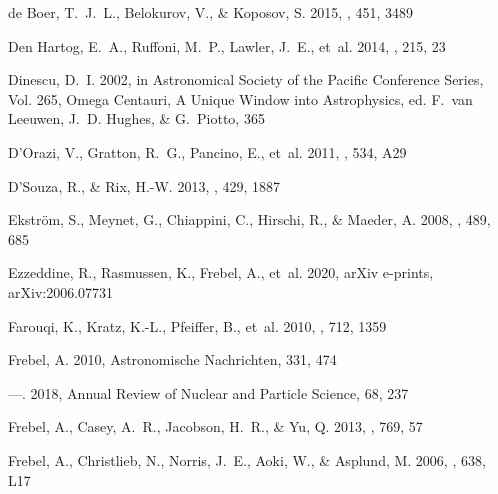 \documentclass[twocolumn]{aastex63}
\begin{document}
\begin{thebibliography}{}
{de Boer}, T.~J.~L., {Belokurov}, V., \& {Koposov}, S. 2015, \mnras, 451, 3489

{Den Hartog}, E.~A., {Ruffoni}, M.~P., {Lawler}, J.~E., {et~al.} 2014, \apjs,
  215, 23

{Dinescu}, D.~I. 2002, in Astronomical Society of the Pacific Conference
  Series, Vol. 265, Omega Centauri, A Unique Window into Astrophysics, ed.
  F.~{van Leeuwen}, J.~D. {Hughes}, \& G.~{Piotto}, 365

{D'Orazi}, V., {Gratton}, R.~G., {Pancino}, E., {et~al.} 2011, \aap, 534, A29

{D'Souza}, R., \& {Rix}, H.-W. 2013, \mnras, 429, 1887

{Ekstr{\"o}m}, S., {Meynet}, G., {Chiappini}, C., {Hirschi}, R., \& {Maeder},
  A. 2008, \aap, 489, 685

{Ezzeddine}, R., {Rasmussen}, K., {Frebel}, A., {et~al.} 2020, arXiv e-prints,
  arXiv:2006.07731

{Farouqi}, K., {Kratz}, K.-L., {Pfeiffer}, B., {et~al.} 2010, \apj, 712, 1359

{Frebel}, A. 2010, Astronomische Nachrichten, 331, 474

---. 2018, Annual Review of Nuclear and Particle Science, 68, 237

{Frebel}, A., {Casey}, A.~R., {Jacobson}, H.~R., \& {Yu}, Q. 2013, \apj, 769,
  57

{Frebel}, A., {Christlieb}, N., {Norris}, J.~E., {Aoki}, W., \& {Asplund}, M.
  2006{}, \apjl, 638, L17


\end{thebibliography}
\end{document}
